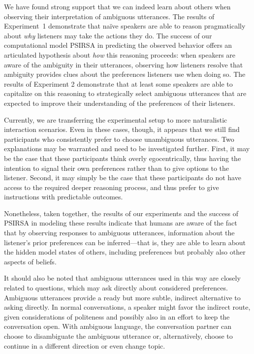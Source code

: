 \documentclass[11pt,a4paper]{article}
\newcommand{\gcs}[1]{\textcolor{blue}{[gcs: #1]}}
\begin{document}
We have found strong support that we can indeed learn about others when observing their interpretation of ambiguous utterances. 
The results of Experiment~1 demonstrate that na\"ive speakers are able to reason pragmatically about \emph{why} listeners may take the actions they do. 
The success of our computational model PSIRSA in predicting the observed behavior offers an articulated hypothesis about \emph{how} this reasoning proceeds: when speakers are aware of the ambiguity in their utterances, observing how listeners resolve that ambiguity provides clues about the preferences listeners use when doing so.
The results of Experiment 2 demonstrate that at least some speakers are able to capitalize on this reasoning to strategically select ambiguous utterances that are expected to improve their understanding of the preferences of their listeners.

 
Currently, we are transferring the experimental setup to more naturalistic interaction scenarios. 
Even in these cases, though, it appears that we still find participants who consistently prefer to choose unambiguous utterances. 
Two explanations may be warranted and need to be investigated further. 
First, it may be the case that these participants think overly egocentrically, thus having the intention to signal their own preferences rather than to give options to the listener. 
Second, it may simply be the case that these participants do not have access to the required deeper reasoning process, and thus prefer to give instructions with predictable outcomes. 

Nonetheless, taken together, the results of our experiments and the success of PSIRSA in modeling these results indicate that humans are aware of the fact that by observing responses to ambiguous utterances, information about the listener's prior preferences can be inferred---that is, they are able to learn about the hidden model states of others, including preferences but probably also other aspects of beliefs. 


It should also be noted that ambiguous utterances used in this way are closely related to questions, which may ask directly about considered preferences.
Ambiguous utterances provide a ready but more subtle, indirect alternative to asking directly. 
In normal conversations, a speaker might favor the indirect route, given considerations of politeness and possibly also in an effort to keep the conversation open. 
With ambiguous language, the conversation partner can choose to disambiguate the ambiguous utterance or, alternatively, choose to continue in a different direction or even change topic.
\end{document}
